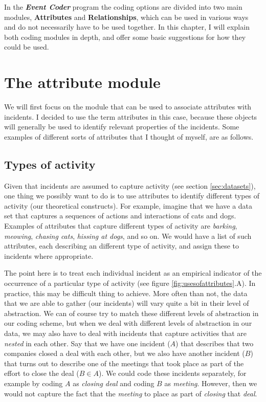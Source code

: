 \documentclass{memoir}
\begin{document}
In the \textbf{\emph{Event Coder}} program the coding options are divided into two main modules, \textbf{Attributes} and \textbf{Relationships}, which can be used in various ways and do not necessarily have to be used together. In this chapter, I will explain both coding modules in depth, and offer some basic suggestions for how they could be used.

\section{The attribute module}
\label{sec:attributemodule}

We will first focus on the module that can be used to associate attributes with incidents. I decided to use the term attributes in this case, because these objects will generally be used to identify relevant properties of the incidents. Some examples of different sorts of attributes that I thought of myself, are as follows.

\subsection{Types of activity}
\label{sec:types of activity}


Given that incidents are assumed to capture activity (see section \ref{sec:datasets}), one thing we possibly want to do is to use attributes to identify different types of activity (our theoretical constructs). For example, imagine that we have a data set that captures a sequences of actions and interactions of cats and dogs. Examples of attributes that capture different types of activity are \emph{barking}, \emph{meowing}, \emph{chasing cats}, \emph{hissing at dogs}, and so on. We would have a list of such attributes, each describing an different type of activity, and assign these to incidents where appropriate.

The point here is to treat each individual incident as an empirical indicator of the occurrence of a particular type of activity (see figure \ref{fig:usesofattributes}.A). In practice, this may be difficult thing to achieve. More often than not, the data that we are able to gather (our incidents) will vary quite a bit in their level of abstraction. We can of course try to match these different levels of abstraction in our coding scheme, but when we deal with different levels of abstraction in our data, we may also have to deal with incidents that capture activities that are \emph{nested} in each other. Say that we have one incident (\(A\)) that describes that two companies closed a deal with each other, but we also have another incident (\(B\)) that turns out to describe one of the meetings that took place as part of the effort to close the deal (\(B \in A\)). We could code these incidents separately, for example by coding \(A\) as \emph{closing deal} and coding \(B\) as \emph{meeting}. However, then we would not capture the fact that the \emph{meeting} to place as part of \emph{closing} that \emph{deal}.
\end{document}
